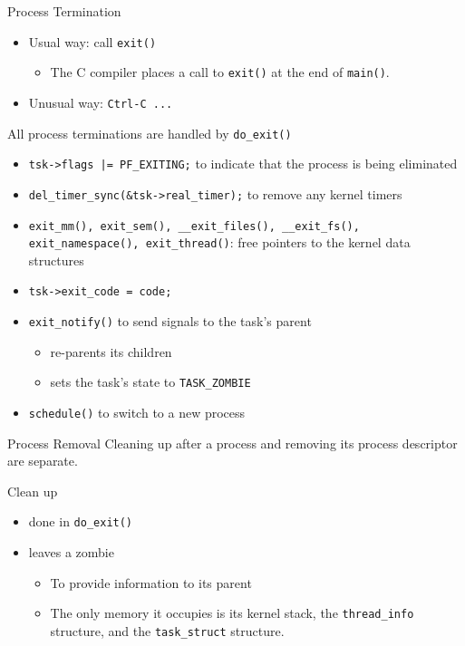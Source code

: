 \begin{frame}{Process Termination}
  \begin{itemize}
  \item Usual way: call \texttt{exit()}
    \begin{itemize}
    \item The C compiler places a call to \texttt{exit()} at the end of \texttt{main()}.
    \end{itemize}
  \item Unusual way: \texttt{Ctrl-C ...}
  \end{itemize}
\end{frame}

\begin{frame}
  \begin{block}{All process terminations are handled by \texttt{do\_exit()}}
    \begin{itemize}
    \item \texttt{tsk->flags |= PF\_EXITING;} to indicate that the process is being eliminated
    \item \texttt{del\_timer\_sync(\&tsk->real\_timer);} to remove any kernel timers
    \item \texttt{exit\_mm(), exit\_sem(), \_\_exit\_files(), \_\_exit\_fs(),
        exit\_namespace(), exit\_thread()}: free pointers to the kernel data structures
    \item \texttt{tsk->exit\_code = code;}
    \item \texttt{exit\_notify()} to send signals to the task's parent
      \begin{itemize}
      \item re-parents its children
      \item sets the task's state to \texttt{TASK\_ZOMBIE}
      \end{itemize}
    \item \texttt{schedule()} to switch to a new process
    \end{itemize}
  \end{block}
\end{frame}

\begin{frame}{Process Removal}
  Cleaning up after a process and removing its process descriptor are separate.
  \begin{block}{Clean up}
    \begin{itemize}
    \item done in \texttt{do\_exit()}
    \item leaves a zombie
      \begin{itemize}
      \item To provide information to its parent
      \item The only memory it occupies is its kernel stack, the \texttt{thread\_info}
        structure, and the \texttt{task\_struct} structure.
      \end{itemize}
    \end{itemize}
  \end{block}
\end{frame}

